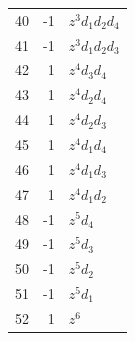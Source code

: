 \begin{longtable}{r r l}
40 & -1 & $z^{3} d_1 d_2 d_4$\\
41 & -1 & $z^{3} d_1 d_2 d_3$\\
42 & 1 & $z^{4} d_3 d_4$\\
43 & 1 & $z^{4} d_2 d_4$\\
44 & 1 & $z^{4} d_2 d_3$\\
45 & 1 & $z^{4} d_1 d_4$\\
46 & 1 & $z^{4} d_1 d_3$\\
47 & 1 & $z^{4} d_1 d_2$\\
48 & -1 & $z^{5} d_4$\\
49 & -1 & $z^{5} d_3$\\
50 & -1 & $z^{5} d_2$\\
51 & -1 & $z^{5} d_1$\\
52 & 1 & $z^{6}$\\
\bottomrule
\end{longtable}
